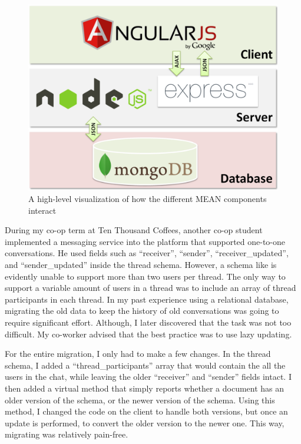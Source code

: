 \documentclass[12pt]{article}
\begin{document}
\begin{figure}
\begin{center}
        \includegraphics[scale=0.5]{resources/mean_diagram.png}
\end{center}
\caption{\label{figcaption} A high-level visualization of how the different MEAN components interact}
\end{figure}

\newpage


During my co-op term at Ten Thousand Coffees, another co-op student implemented a messaging service into the platform that supported one-to-one conversations. He used fields such as ``receiver'', ``sender'', ``receiver{\_}updated'', and ``sender{\_}updated'' inside the thread schema. However, a schema like is evidently unable to support more than two users per thread. The only way to support a variable amount of users in a thread was to include an array of thread participants in each thread. In my past experience using a relational database, migrating the old data to keep the history of old conversations was going to require significant effort. Although, I later discovered that the task was not too difficult. My co-worker advised that the best practice was to use lazy updating.

For the entire migration, I only had to make a few changes. In the thread schema, I added a ``thread{\_}participants'' array that would contain the all the users in the chat, while leaving the older ``receiver'' and ``sender'' fields intact. I then added a virtual method that simply reports whether a document has an older version of the schema, or the newer version of the schema. Using this method, I changed the code on the client to handle both versions, but once an update is performed, to convert the older version to the newer one. This way, migrating was relatively pain-free.

\newpage
\end{document}
